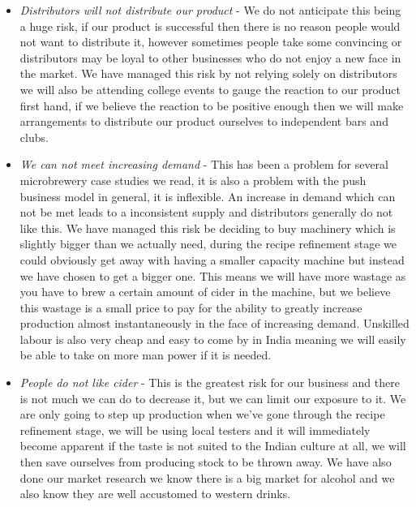 \documentclass[11pt]{article}
\begin{document}
\begin{itemize}
\item \emph{Distributors will not distribute our product} - We do not 
anticipate this being a huge risk, if our product is successful then there is no
reason people would not want to distribute it, however sometimes people take 
some convincing or distributors may be loyal to other businesses who do not 
enjoy a new face in the market. We have managed this risk by not relying solely 
on distributors we will also be attending college events to gauge the reaction 
to our product first hand, if we believe the reaction to be positive enough then
we will make arrangements to distribute our product ourselves to independent 
bars and clubs. 
\item \emph{We can not meet increasing demand} - This has been a problem for 
several microbrewery case studies we read, it is also a problem with the push 
business model in general, it is inflexible. An increase in demand which can not 
be met leads to a inconsistent supply and distributors generally do not like 
this. We have managed this risk be deciding to buy machinery which is slightly 
bigger than we actually need, during the recipe refinement stage we could 
obviously get away with having a smaller capacity machine but instead we have 
chosen to get a bigger one. This means we will have more wastage as you have to
brew a certain amount of cider in the machine, but we believe this wastage is a small price to 
pay for the ability to greatly increase production almost instantaneously in the
 face of increasing demand. Unskilled labour 
is also very cheap and easy to come by in India meaning we will easily be able 
to take on more man power if it is needed. 
\item \emph{People do not like cider} - This is the greatest risk for our
business and there is not much we can do to decrease it, but we can
limit our exposure to it. We are only going to step up production when we've 
gone through the recipe refinement stage, we will be using local testers and it 
will immediately become apparent if the taste is not suited to the Indian 
culture at all, we will then save ourselves from producing stock to be thrown 
away. We have also done our market research we know there is a big market for 
alcohol and we also know they are well accustomed to western drinks.
\end{itemize}

\newpage

\end{document}
